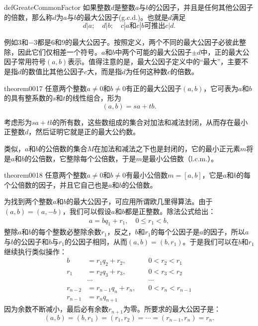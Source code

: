 \begin{definition}{}{defGreateCommonFactor}
如果整数$d$是整数$a$与$b$的公因子，并且是任何其他公因子的倍数，那么称$d$为$a$与$b$的最大公因子(g.c.d.)。也就是$d$满足
\[
d|a; \quad{}d|b;\quad{} c|a\text{和}c|b \text{可推出}c|d.
\]
\end{definition}

例如$3$和$-3$都是6和9的最大公因子。按照定义，两个不同的最大公因子必彼此整除，因此它们仅相差一个符号。$a$和$b$中两个可能的最大公因子$\pm{}d$中，正的最大公因子常用符号$(a, b)$表示。值得注意的是，最大公因子定义中的“最大”，主要不是指$d$的数值比其他公因子$c$大，而是指$d$为任何这种数$c$的倍数。

\begin{theorem}{}{theorem0017}
任意两个整数$a \neq 0$和$b \neq 0$有正的最大公因子$(a, b)$，它可表为$a$和$b$的具有整系数的$s$和$t$的线性组合，形为
\begin{equation}\label{equation0013}
(a,b)=sa+tb.
\end{equation}
\end{theorem}

考虑形为$sa+tb$的所有数，这些数组成的集合对加法和减法封闭，从而存在最小正整数$d$，然后证明它就是正的最大公约数。

类似，$a$和$b$的公倍数的集合$M$在加法和减法之下也是封闭的，它的最小正元素$m$将是$a$和$b$的公倍数，它整除每个公倍数，于是$m$是最小公倍数（l.c.m.）。
\begin{theorem}{}{theorem0018}
任意两个整数$a \neq 0$和$b \neq 0$有最小公倍数$m=[a, b]$，它是$a$和$b$的每个公倍数的因子，并且它自己也是$a$和$b$的公倍数。
\end{theorem}

为找到两个整数$a$和$b$的最大公因子，可应用所谓欧几里得算法。由于$(a, b) = (a, -b)$，我们可以假设$a$和$b$都是正整数。除法公式给出：
\begin{gather}\label{equation0014}
a = bq_1+r_1, \quad 0 \le r_1 < b,
\end{gather}
整除$a$和$b$的每个整数必整除余数$r_1$，反之，$b$和$r_1$的每个公因子是$a$的因子，所以$a$与$b$的公因子和$b$与$r_1$的公因子相同，从而$(a,b)= (b, r_1)$。于是我们可以在$b$和$r_1$继续执行类似操作：
\begin{equation}
\begin{aligned}
b &= r_1q_2 + r_2, \quad  &0 < r_2 < r_1 \\
r_1 &= r_2q_3 + r_3, \quad &0 < r_3 < r_2 \\
&\cdots& \cdots\\
r_{n-2} &= r_{n-1}q_n + r_n, \quad &0 < r_n < r_{n-1}\\
r_{n-1} &= r_nq_{n+1}&
\end{aligned}
\end{equation}
因为余数不断减小，最后必有余数$r_{n+1}$为零。所要求的最大公因子是：
\[
(a, b) = (b, r_1) = (r_1, r_2) = \cdots = (r_{n-1}, r_n) = r_n.
\]

